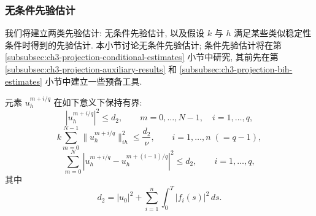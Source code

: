 \subsubsection{无条件先验估计}
\label{subsubsec:ch3-projection-unconditional-estimates}

我们将建立两类先验估计: 无条件先验估计, 以及假设 $k$ 与 $h$ 满足某些类似稳定性条件时得到的先验估计. 本小节讨论无条件先验估计; 条件先验估计将在第 \ref{subsubsec:ch3-projection-conditional-estimates} 小节中研究, 其前先在第 \ref{subsubsec:ch3-projection-auxiliary-results} 和 \ref{subsubsec:ch3-projection-bih-estimates} 小节中建立一些预备工具.

\hypertarget{chapter-03-page-295}{}
\begin{Lemma}
\label{lem:ch3-projection-discrete-basic-estimates}
元素 $u_h^{m+i/q}$ 在如下意义下保持有界:
\begin{equation}
|u_h^{m+i/q}|^2\leq d_2,
\qquad m=0,\ldots,N-1,\quad i=1,\ldots,q,
\label{eq:ch3-projection-discrete-linfty}
\end{equation}
\begin{equation}
k\sum_{m=0}^{N-1}\lVert u_h^{m+i/q}\rVert_{ih}^2
\leq\frac{d_2}{\nu},
\qquad i=1,\ldots,n\;(=q-1),
\label{eq:ch3-projection-discrete-directional-h1}
\end{equation}
\begin{equation}
\sum_{m=0}^{N}\left|u_h^{m+i/q}-u_h^{m+(i-1)/q}\right|^2
\leq d_2,\qquad i=1,\ldots,q,
\label{eq:ch3-projection-discrete-stage-jumps}
\end{equation}
其中
\begin{equation}
d_2=|u_0|^2+\sum_{i=1}^n\int_0^T|f_i(s)|^2\,ds.
\label{eq:ch3-projection-discrete-data-bound}
\end{equation}
\end{Lemma}


